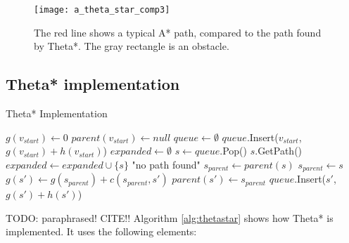 \begin{figure}
\texttt{[image: a\_theta\_star\_comp3]}
\caption{The red line shows a typical A* path, compared to the path found by Theta*. The gray rectangle is an obstacle.}
\label{figure:thetastarcompare}
\end{figure}


\subsection{Theta* implementation}
\begin{algorithm}
\caption{Theta* Implementation}
\label{alg:thetastar}
\begin{algorithmic}[1]
	\State $g(v_{start}) \leftarrow 0$
	\State $parent(v_{start}) \leftarrow null$
	\State $queue \leftarrow \emptyset$
	\State $queue$.Insert($v_{start}$, $g(v_{start}) + h(v_{start})$)
	\State $expanded \leftarrow \emptyset$
		\State $s \leftarrow queue$.Pop()
			\Return $s$.GetPath()
		\EndIf
		\State $expanded \leftarrow expanded \cup \{s\}$
			\EndIf
		\EndFor
	\EndWhile
	\Return "no path found"
\EndFunction
{}
		\State $s_{parent} \leftarrow parent(s)$
	\Else
		\State $s_{parent} \leftarrow s$	
	\EndIf
		\State $g(s') \leftarrow g(s_{parent}) + c(s_{parent},s')$
		\State $parent(s') \leftarrow s_{parent}$
		\State $queue$.Insert($s'$,$g(s') + h(s')$)
	\EndIf
\EndFunction{}
\end{algorithmic}
\end{algorithm}
TODO: paraphrased! CITE!!
Algorithm \ref{alg:thetastar} shows how Theta* is implemented. It uses the following elements:
